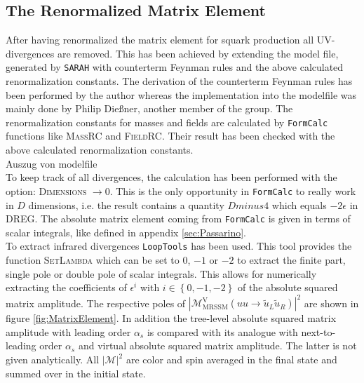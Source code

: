 \subsection{The Renormalized Matrix Element}
After having renormalized the matrix element for squark production all UV-divergences are removed. This has been achieved by extending the model file, generated by \texttt{SARAH} with counterterm Feynman rules and the above calculated renormalization constants. The derivation of the counterterm Feynman rules has been performed by the author whereas the implementation into the modelfile was mainly done by Philip Dießner, another member of the group. The renormalization constants for masses and fields are calculated by \texttt{FormCalc} functions like \textsc{MassRC} and \textsc{FieldRC}\cite{FormCalcManual}. Their result has been checked with the above calculated renormalization constants.\\
Auszug von modelfile\\
To keep track of all divergences, the calculation has been performed with the option: \textsc{Dimensions} $\to 0$. This is the only opportunity in \texttt{FormCalc} to really work in $D$ dimensions, i.e. the result contains a quantity $Dminus4$ which equals $-2\epsilon$ in DREG. The absolute matrix element coming from \texttt{FormCalc} is given in terms of scalar integrals, like defined in appendix \ref{sec:Passarino}.\\
To extract infrared divergences \texttt{LoopTools} has been used. This  tool provides the function \textsc{SetLambda} which can be set to 0, $-1$ or $-2$ to extract the finite part, single pole or double pole of  scalar integrals. This allows for numerically extracting the coefficients of $\epsilon^i$ with $i \in \left\{ 0,-1,-2 \right\}$ of the absolute squared matrix amplitude. The respective poles of $|\mathcal{M}^{\mathrm{V}}_{\mathrm{MRSSM}}(uu \to \tilde{u}_L\tilde{u}_R)|^2$ are shown in figure \ref{fig:MatrixElement}. In addition the tree-level absolute squared matrix amplitude with leading order $\alpha_s$ is compared with its analogue with next-to-leading order $\alpha_s$ and virtual absolute squared matrix amplitude. The latter is  not given analytically. All $|\mathcal{M}|^2$ are color and spin averaged in the final state and summed over in the initial state.
